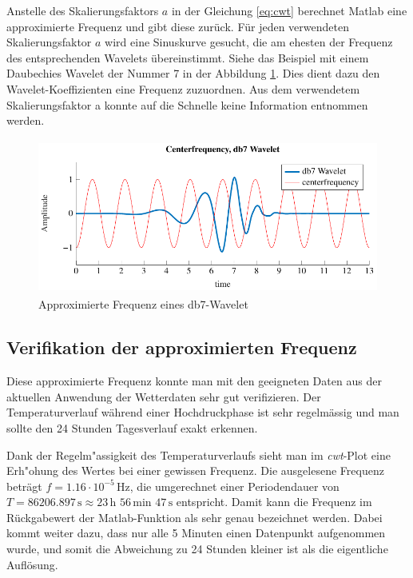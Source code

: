 \begin{refsection}
Anstelle des Skalierungsfaktors $a$ in der Gleichung \ref{eq:cwt} berechnet Matlab eine approximierte Frequenz und gibt diese zurück.
Für jeden verwendeten Skalierungsfaktor $a$ wird eine Sinuskurve gesucht, die am ehesten der Frequenz des entsprechenden Wavelets übereinstimmt.
Siehe das Beispiel mit einem Daubechies Wavelet der Nummer 7 in der Abbildung \ref{fig:centerf}.
Dies dient dazu den Wavelet-Koeffizienten eine Frequenz zuzuordnen. 
Aus dem verwendetem Skalierungsfaktor a konnte auf die Schnelle keine Information entnommen werden.
\begin{figure}
	\centering
	\includegraphics[width=1\textwidth, height=2in]{papers/wwt/images/centerf.pdf}
	\caption{Approximierte Frequenz eines db7-Wavelet}
	\label{fig:centerf}
\end{figure}


\newpage
\subsection{Verifikation der approximierten Frequenz}
\label{Freq}
Diese approximierte Frequenz konnte man mit den geeigneten Daten aus der aktuellen Anwendung der Wetterdaten sehr gut verifizieren.
Der Temperaturverlauf während einer Hochdruckphase ist sehr regelmässig und man sollte den 24 Stunden Tagesverlauf exakt erkennen.

Dank der Regelm"assigkeit des Temperaturverlaufs sieht man im \textit{cwt}-Plot eine Erh"ohung des Wertes bei einer gewissen Frequenz.
Die ausgelesene Frequenz beträgt $f = 1.16\cdot10^{-5} \,\text{Hz}$, die umgerechnet einer Periodendauer von $T = 86206.897\,\text{s}\approx 23\,\text{h }56\,\text{min } 47\,\text{s}$ entspricht.
Damit kann die Frequenz im Rückgabewert der Matlab-Funktion als sehr genau bezeichnet werden.
Dabei kommt weiter dazu, dass nur alle 5 Minuten einen Datenpunkt aufgenommen wurde, und somit die Abweichung zu 24 Stunden kleiner ist als die eigentliche Auflösung.


\end{refsection}
